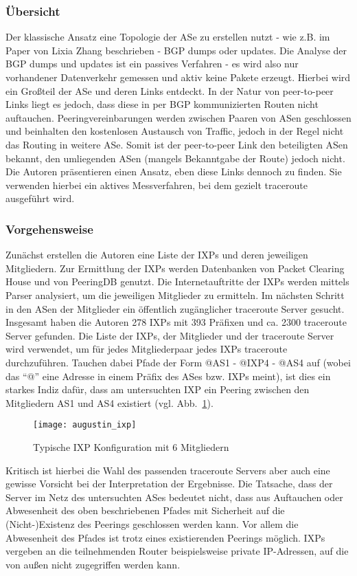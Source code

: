 \subsubsection{Übersicht}
Der klassische Ansatz eine Topologie der ASe zu erstellen nutzt - wie z.B. im Paper von Lixia Zhang beschrieben - BGP dumps oder updates.
Die Analyse der BGP dumps und updates ist ein passives Verfahren - es wird also nur vorhandener Datenverkehr gemessen und aktiv keine Pakete erzeugt.
Hierbei wird ein Großteil der ASe und deren Links entdeckt.
In der Natur von peer-to-peer Links liegt es jedoch, dass diese in per BGP kommunizierten Routen nicht auftauchen.
Peeringvereinbarungen werden zwischen Paaren von ASen geschlossen und beinhalten den kostenlosen Austausch von Traffic, jedoch in der Regel nicht das Routing in weitere ASe.
Somit ist der peer-to-peer Link den beteiligten ASen bekannt, den umliegenden ASen (mangels Bekanntgabe der Route) jedoch nicht.
Die Autoren präsentieren einen Ansatz, eben diese Links dennoch zu finden.
Sie verwenden hierbei ein aktives Messverfahren, bei dem gezielt traceroute ausgeführt wird.

\subsubsection{Vorgehensweise}
Zunächst erstellen die Autoren eine Liste der IXPs und deren jeweiligen Mitgliedern.
Zur Ermittlung der IXPs werden Datenbanken von Packet Clearing House und von PeeringDB genutzt.
Die Internetauftritte der IXPs werden mittels Parser analysiert, um die jeweiligen Mitglieder zu ermitteln.
Im nächsten Schritt in den ASen der Mitglieder ein öffentlich zugänglicher traceroute Server gesucht.
Insgesamt haben die Autoren 278 IXPs mit 393 Präfixen und ca. 2300 traceroute Server gefunden.
Die Liste der IXPs, der Mitglieder und der traceroute Server wird verwendet, um für jedes Mitgliederpaar jedes IXPs traceroute durchzuführen.
Tauchen dabei Pfade der Form @AS1 - @IXP4 - @AS4 auf (wobei das "`@"' eine Adresse in einem Präfix des ASes bzw. IXPs meint), ist dies ein starkes Indiz dafür, dass am untersuchten IXP ein Peering zwischen den Mitgliedern AS1 und AS4 existiert (vgl. Abb.~\ref{fig:augustin_ixp}).
\begin{figure}
  \begin{center}
    \texttt{[image: augustin\_ixp]}
    \caption{Typische IXP Konfiguration mit 6 Mitgliedern} \label{fig:augustin_ixp}
  \end{center}
\end{figure}
Kritisch ist hierbei die Wahl des passenden traceroute Servers aber auch eine gewisse Vorsicht bei der Interpretation der Ergebnisse.
Die Tatsache, dass der Server im Netz des untersuchten ASes bedeutet nicht, dass aus Auftauchen oder Abwesenheit des oben beschriebenen Pfades mit Sicherheit auf die (Nicht-)Existenz des Peerings geschlossen werden kann.
Vor allem die Abwesenheit des Pfades ist trotz eines existierenden Peerings möglich.
IXPs vergeben an die teilnehmenden Router beispielsweise private IP-Adressen, auf die von außen nicht zugegriffen werden kann.

